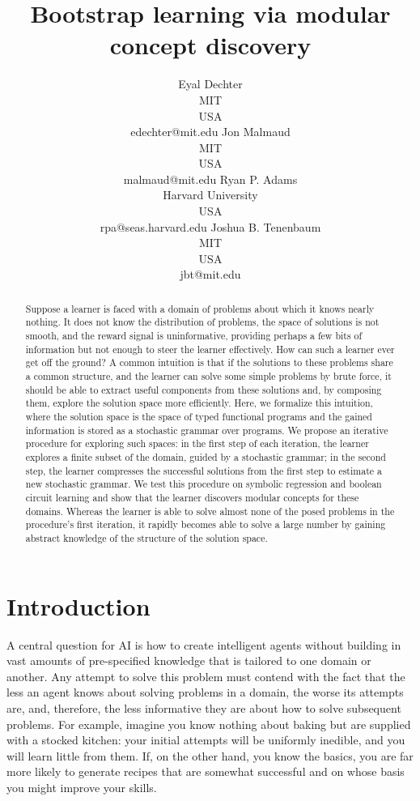 \documentclass{article}
\title{Bootstrap learning via modular concept discovery}
\author{Eyal Dechter \\
MIT\\
USA \\
edechter@mit.edu
\And
Jon Malmaud \\
MIT \\ 
USA \\
malmaud@mit.edu
\And 
Ryan P.  Adams \\
Harvard University\\
USA \\
rpa@seas.harvard.edu
\And
Joshua B. Tenenbaum \\
MIT\\
USA \\
jbt@mit.edu
}
\begin{document}
\maketitle
\begin{abstract}
 Suppose a learner is faced with a domain of problems about which it
 knows nearly nothing. It does not know the distribution of problems,
 the space of solutions is not smooth, and the reward signal is
 uninformative, providing perhaps a few bits of information but not
 enough to steer the learner effectively. How can such a learner ever
 get off the ground? A common intuition is that if the solutions to
 these problems share a common structure, and the learner can solve
 some simple problems by brute force, it should be able to extract
 useful components from these solutions and, by composing them,
 explore the solution space more efficiently. Here, we formalize this
 intuition, where the solution space is the space of typed functional
 programs and the gained information is stored as a stochastic grammar
 over programs. We propose an iterative procedure for exploring such
 spaces: in the first step of each iteration, the learner explores a
 finite subset of the domain, guided by a stochastic grammar; in the
 second step, the learner compresses the successful solutions from the
 first step to estimate a new stochastic grammar. We test this
 procedure on symbolic regression and boolean circuit learning and
 show that the learner discovers modular concepts for these
 domains. Whereas the learner is able to solve almost none of the
 posed problems in the procedure's first iteration, it rapidly becomes
 able to solve a large number by gaining abstract knowledge of the
 structure of the solution space.
 
 
\end{abstract}

\section{Introduction}
A central question for AI is how to create intelligent agents without
building in vast amounts of pre-specified knowledge that is tailored
to one domain or another. Any attempt to solve this problem must
contend with the fact that the less an agent knows about solving
problems in a domain, the worse its attempts are, and, therefore, the
less informative they are about how to solve subsequent problems. For
example, imagine you know nothing about baking but are supplied with a
stocked kitchen: your initial attempts will be uniformly inedible, and
you will learn little from them. If, on the other hand, you know the
basics, you are far more likely to generate recipes that are
somewhat successful and on whose basis you might improve your skills.
\end{document}
